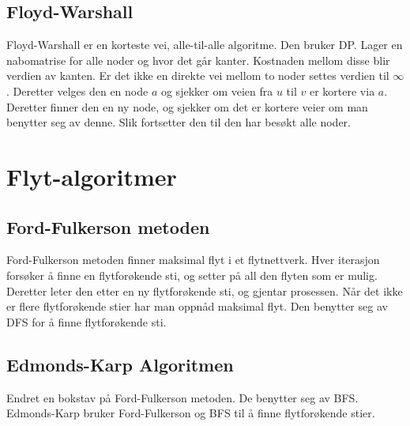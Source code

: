 \documentclass[a4paper, norsk,  10pt]{article}
\begin{document}
{{\begin{algorithmic}
\subsection{Floyd-Warshall}

Floyd-Warshall er en korteste vei, alle-til-alle algoritme. Den bruker DP. Lager en nabomatrise for alle noder og hvor det går kanter. Kostnaden mellom disse blir verdien av kanten. Er det ikke en direkte vei mellom to noder settes verdien til $\infty$. Deretter velges den en node $a$ og sjekker om veien fra $u$ til $v$ er kortere via $a$. Deretter finner den en ny node, og sjekker om det er kortere veier om man benytter seg av denne. Slik fortsetter den til den har besøkt alle noder.  \\ \hfill

\begin{algoritmic}
\State ${D^{(0)} = W$
\For {$k = 1$ to $n$}
	\State let ${D^{(k)}$ be a $n$ x $n$ matrix
	\For {$i = 1$ to $n$}
		\For {$j = 1$ to $n$}
			\State ${D_{ij}^{(k)} = min(${D_{ij}^{(k-1)}, {D_{ik}^{(k-1)} + {D_{kj}^{(k-1)})$
		\EndFor
	\EndFor
\EndFor
\State \Return ${D^{(n)}$
\EndFunction

\end{algoritmic}

\section{Flyt-algoritmer}

\subsection{Ford-Fulkerson metoden}

Ford-Fulkerson metoden finner maksimal flyt i et flytnettverk. Hver iterasjon forsøker å finne en flytforøkende sti, og setter på all den flyten som er mulig. Deretter leter den etter en ny flytforøkende sti, og gjentar prosessen. Når det ikke er flere flytforøkende stier har man oppnåd maksimal flyt. Den benytter seg av DFS for å finne flytforøkende sti. 

\subsection{Edmonds-Karp Algoritmen}

Endret en bokstav på Ford-Fulkerson metoden. De benytter seg av BFS. Edmonds-Karp bruker Ford-Fulkerson og BFS til å finne flytforøkende stier. 


\end{algorithmic}}}
\end{document}
